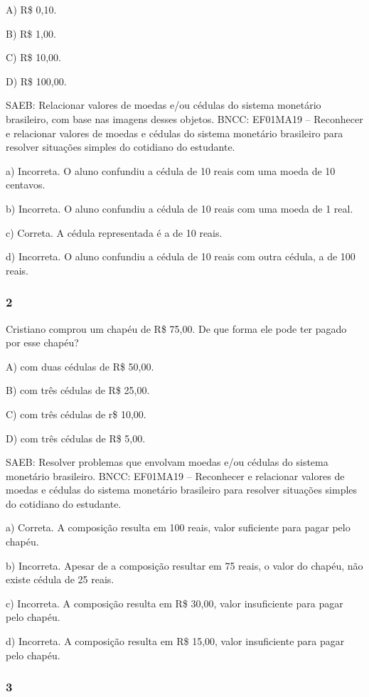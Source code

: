 A) R\$ 0,10.

B) R\$ 1,00.

C) R\$ 10,00.

D) R\$ 100,00.

SAEB: Relacionar valores de moedas e/ou cédulas do sistema
monetário brasileiro, com base nas imagens desses objetos.
BNCC: EF01MA19 -- Reconhecer e relacionar valores de moedas e cédulas do
sistema monetário brasileiro para resolver situações simples do
cotidiano do estudante.

a) Incorreta. O aluno confundiu a cédula de 10 reais com uma moeda de 10 centavos.

b) Incorreta. O aluno confundiu a cédula de 10 reais com uma moeda de 1 real.

c) Correta. A cédula representada é a de 10 reais.

d) Incorreta. O aluno confundiu a cédula de 10 reais com outra cédula, a de 100 reais.

\subsubsection{2}\label{section-61}

Cristiano comprou um chapéu de R\$ 75,00. De que forma ele pode ter pagado por esse chapéu?

A) com duas cédulas de R\$ 50,00.

B) com três cédulas de R\$ 25,00.

C) com três cédulas de r\$ 10,00.

D) com três cédulas de R\$ 5,00.

SAEB: Resolver problemas que envolvam moedas e/ou cédulas do
sistema monetário brasileiro.
BNCC: EF01MA19 -- Reconhecer e relacionar valores de moedas e cédulas do
sistema monetário brasileiro para resolver situações simples do
cotidiano do estudante.

a) Correta. A composição resulta em 100 reais, valor suficiente para pagar pelo chapéu.

b) Incorreta. Apesar de a composição resultar em 75 reais, o valor do chapéu, não existe cédula de 25 reais.

c) Incorreta. A composição resulta em R\$ 30,00, valor insuficiente para pagar pelo chapéu.

d) Incorreta. A composição resulta em R\$ 15,00, valor insuficiente para pagar pelo chapéu.

\subsubsection{3}\label{section-62}

